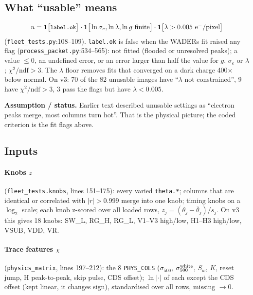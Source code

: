 \documentclass[10pt,a4paper]{article}
\newcommand{\code}[1]{\texttt{\small #1}}
\newcommand{\one}{\mathbf 1}
\newcommand{\caveat}[1]{\par\smallskip\noindent\colorbox{orange!10}{\parbox{\dimexpr\linewidth-2\fboxsep}{\small\textbf{Assumption / status.} #1}}\par\smallskip}
\begin{document}
\subsection{What ``usable'' means}
\begin{equation}
u=\one\big[\code{label.ok}\big]\cdot\one\big[\ln\sigma_e,\ln\lambda,\ln g\ \text{finite}\big]\cdot\one\big[\lambda>0.005\ \text{e}^-/\text{pixel}\big]
\end{equation}
(\code{fleet\_tests.py}:108--109). \code{label.ok} is false when the WADERs fit raised any flag
(\code{process\_packet.py}:534--565): not fitted (flooded or unresolved peaks); a value $\le0$, an undefined error, or an error
larger than half the value for $g$, $\sigma_e$ or $\lambda$; $\chi^2/\text{ndf}>3$. The $\lambda$ floor removes fits that
converged on a dark charge 400$\times$ below normal. On v3: 70 of the 82 unusable images have ``$\lambda$ not constrained'',
9 have $\chi^2/\text{ndf}>3$, 3 pass the flags but have $\lambda<0.005$.

\caveat{Earlier text described unusable settings as ``electron peaks merge, most columns turn hot''. That is the physical
picture; the coded criterion is the fit flags above.}

\subsection{Inputs}\label{sec:knobs}
\paragraph{Knobs $z$} (\code{fleet\_tests.knobs}, lines 151--175): every varied \code{theta.*}; columns that are identical or
correlated with $|r|>0.999$ merge into one knob; timing knobs on a $\log_2$ scale; each knob z-scored over all loaded rows,
$z_j=(\theta_j-\bar\theta_j)/s_j$. On v3 this gives 18 knobs: SW\_L, RG\_H, RG\_L, V1--V3 high/low, H1--H3 high/low, VSUB, VDD, VR.

\paragraph{Trace features $\chi$} (\code{physics\_matrix}, lines 197--212): the 8 \code{PHYS\_COLS} ($\sigma_{500}$,
$\sigma_{500}^{\rm white}$, $S_w$, $K$, reset jump, H peak-to-peak, skip pulse, CDS offset); $\ln|\cdot|$ of each except the CDS
offset (kept linear, it changes sign), standardised over all rows, missing $\to0$.
\end{document}
